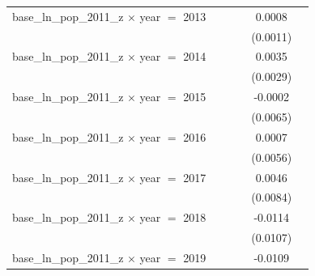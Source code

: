\begin{tabular}{lccccc}
   base\_ln\_pop\_2011\_z $\times$ year $=$ 2013                &                    &                 &                       & 0.0008                     &   \\   
                                                                &                    &                 &                       & (0.0011)                   &   \\   
   base\_ln\_pop\_2011\_z $\times$ year $=$ 2014                &                    &                 &                       & 0.0035                     &   \\   
                                                                &                    &                 &                       & (0.0029)                   &   \\   
   base\_ln\_pop\_2011\_z $\times$ year $=$ 2015                &                    &                 &                       & -0.0002                    &   \\   
                                                                &                    &                 &                       & (0.0065)                   &   \\   
   base\_ln\_pop\_2011\_z $\times$ year $=$ 2016                &                    &                 &                       & 0.0007                     &   \\   
                                                                &                    &                 &                       & (0.0056)                   &   \\   
   base\_ln\_pop\_2011\_z $\times$ year $=$ 2017                &                    &                 &                       & 0.0046                     &   \\   
                                                                &                    &                 &                       & (0.0084)                   &   \\   
   base\_ln\_pop\_2011\_z $\times$ year $=$ 2018                &                    &                 &                       & -0.0114                    &   \\   
                                                                &                    &                 &                       & (0.0107)                   &   \\   
   base\_ln\_pop\_2011\_z $\times$ year $=$ 2019                &                    &                 &                       & -0.0109                    &   \\   

\end{tabular}
